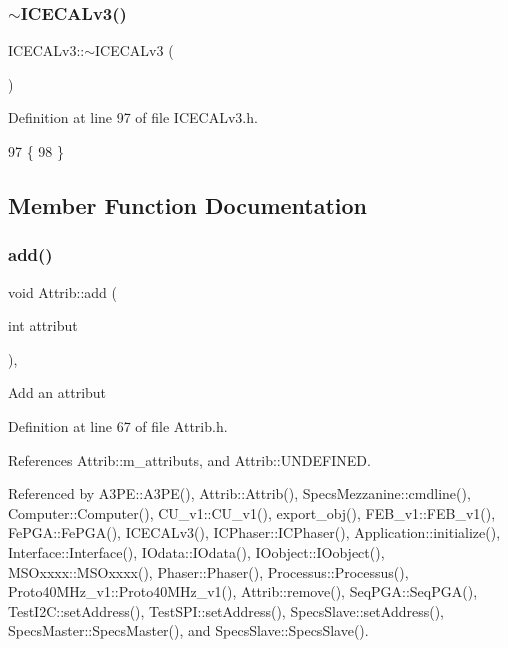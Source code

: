\subsubsection{\texorpdfstring{$\sim$\+I\+C\+E\+C\+A\+Lv3()}{~ICECALv3()}}
{\footnotesize\ttfamily I\+C\+E\+C\+A\+Lv3\+::$\sim$\+I\+C\+E\+C\+A\+Lv3 (\begin{DoxyParamCaption}{ }\end{DoxyParamCaption})\hspace{0.3cm}{\ttfamily [inline]}}



Definition at line 97 of file I\+C\+E\+C\+A\+Lv3.\+h.


\begin{DoxyCode}
97              \{
98   \}
\end{DoxyCode}


\subsection{Member Function Documentation}
\mbox{\label{classAttrib_a235f773af19c900264a190b00a3b4ad7}} 
\subsubsection{\texorpdfstring{add()}{add()}}
{\footnotesize\ttfamily void Attrib\+::add (\begin{DoxyParamCaption}\item[{int}]{attribut }\end{DoxyParamCaption})\hspace{0.3cm}{\ttfamily [inline]}, {\ttfamily [inherited]}}

Add an attribut 

Definition at line 67 of file Attrib.\+h.



References Attrib\+::m\+\_\+attributs, and Attrib\+::\+U\+N\+D\+E\+F\+I\+N\+ED.



Referenced by A3\+P\+E\+::\+A3\+P\+E(), Attrib\+::\+Attrib(), Specs\+Mezzanine\+::cmdline(), Computer\+::\+Computer(), C\+U\+\_\+v1\+::\+C\+U\+\_\+v1(), export\+\_\+obj(), F\+E\+B\+\_\+v1\+::\+F\+E\+B\+\_\+v1(), Fe\+P\+G\+A\+::\+Fe\+P\+G\+A(), I\+C\+E\+C\+A\+Lv3(), I\+C\+Phaser\+::\+I\+C\+Phaser(), Application\+::initialize(), Interface\+::\+Interface(), I\+Odata\+::\+I\+Odata(), I\+Oobject\+::\+I\+Oobject(), M\+S\+Oxxxx\+::\+M\+S\+Oxxxx(), Phaser\+::\+Phaser(), Processus\+::\+Processus(), Proto40\+M\+Hz\+\_\+v1\+::\+Proto40\+M\+Hz\+\_\+v1(), Attrib\+::remove(), Seq\+P\+G\+A\+::\+Seq\+P\+G\+A(), Test\+I2\+C\+::set\+Address(), Test\+S\+P\+I\+::set\+Address(), Specs\+Slave\+::set\+Address(), Specs\+Master\+::\+Specs\+Master(), and Specs\+Slave\+::\+Specs\+Slave().


